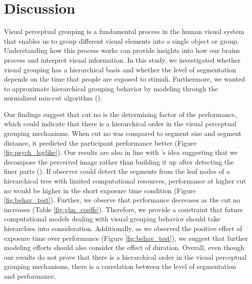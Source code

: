 \documentclass{article}
\begin{document}
\clearpage

\section{Discussion}
Visual perceptual grouping is a fundamental process in the human visual system that enables us to group different visual elements into a single object or group. Understanding how this process works can provide insights into how our brains process and interpret visual information. In this study, we investigated whether visual grouping has a hierarchical basis and whether the level of segmentation depends on the time that people are exposed to stimuli. Furthermore, we wanted to approximate hierarchical grouping behavior by modeling through the normalized min-cut algorithm (\cite{RN165}).

Our findings suggest that cut no is the determining factor of the performance, which could indicate that there is a hierarchical order in the visual perceptual grouping mechanisms. When cut no was compared to segment size and segment distance, it predicted the participant performance better (Figure \ref{fig:psych_loglike}). Our results are also in line with \citeauthor{RN231}'s idea suggesting that we decompose the perceived image rather than building it up after detecting the finer parts (\citeyear{RN231}). If observer could detect the segments from the leaf nodes of a hierarchical tree with limited computational resources, performance at higher cut no would be higher in the short exposure time condition (Figure \ref{fig:behav_test}). Further, we observe that performance decreases as the cut no increases (Table \ref{fig:glm_coeffs}). Therefore, we provide a constraint that future computational models dealing with visual grouping behavior should take hierarchies into consideration. Additionally, as we observed the positive effect of exposure time over performance (Figure \ref{fig:behav_test}), we suggest that further modeling efforts should also consider the effect of duration. Overall, even though our results do not prove that there is a hierarchical order in the visual perceptual grouping mechanisms, there is a correlation between the level of segmentation and performance. 
\end{document}
